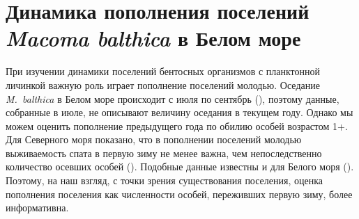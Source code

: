 		\section{Динамика пополнения поселений {\it Macoma balthica} в Белом море}
При изучении динамики поселений бентосных организмов с планктонной личинкой важную роль играет пополнение поселений молодью. 
Оседание {\it M.~balthica} в Белом море происходит с июля по сентябрь (\cite{Semenova_1980, Maximovich_1985}), поэтому данные, собранные в июле, не описывают величину оседания в текущем году. 
Однако мы можем оценить пополнение предыдущего года по обилию особей возрастом 1+. 
Для Северного моря показано, что в пополнении поселений молодью выживаемость спата в первую зиму не менее важна, чем непоследственно количество осевших особей (\cite{Beukema_et_al_1998, Strasser_Gunter_2001}). Подобные данные известны и для Белого моря (\cite{Maximovich_Gerasimova_2004}). Поэтому, на наш взгляд, с точки зрения существования поселения, оценка пополнения поселения как численности особей, переживших первую зиму, более информативна.







\bigskip

